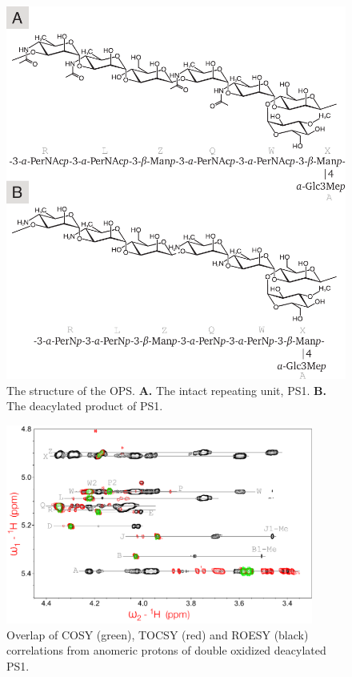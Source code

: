 		\begin{figure}[H]
			\begin{center}
				\includegraphics[]{lps_chapter/img/lpsops.pdf}
			\end{center}
			\caption[The structure of the \caulobacter \ac{OPS}.]{The structure of the \caulobacter \ac{OPS}. \textbf{A.} The intact repeating unit, \ac{PS}1. \textbf{B.} The deacylated product of \ac{PS}1.}
			\label{fig:lpsops}
		\end{figure}

		\begin{figure}[H]
			\begin{center}
				\includegraphics[width=0.9\textwidth]{lps_chapter/img/lpsfig3.pdf}
			\end{center}
			\caption[2D \ac{NMR} of \caulobacter{} \ac{PS}1.]{Overlap of \ac{COSY} (green), \ac{TOCSY} (red) and \ac{ROESY} (black) correlations from anomeric protons of double oxidized deacylated \caulobacter{} \ac{PS}1.}
			\label{fig:lps2dnmr}
		\end{figure}

